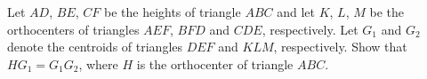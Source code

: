 Let $AD$, $BE$, $CF$ be the heights of triangle $ABC$ and let $K$, $L$, $M$ be the orthocenters of triangles $AEF$, $BFD$ and $CDE$, respectively. Let $G_1$ and $G_2$ denote the centroids of triangles $DEF$ and $KLM$, respectively. Show that $HG_1 = G_1G_2$, where $H$ is the orthocenter of triangle $ABC$.